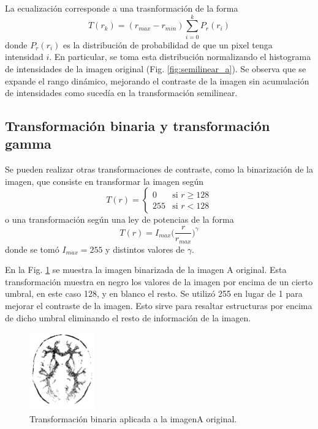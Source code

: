 \documentclass[letterpaper,12pt]{article}
\theoremstyle{plain}
\begin{document}
La ecualización corresponde a una trasnformación de la forma
\begin{equation}
    T(r_k) = (r_{max} - r_{min}) \sum_{i=0}^{k} P_r(r_i)
\end{equation}
donde $P_r(r_i)$ es la distribución de probabilidad de que un pixel tenga intensidad $i$. En particular, se toma esta distribución normalizando el histograma de intensidades de la imagen original (Fig. \ref{fig:semilinear_a}). Se observa que se expande el rango dinámico, mejorando el contraste de la imagen sin acumulación de intensidades como sucedía en la transformación semilinear.

\subsection{Transformación binaria y transformación gamma}

Se pueden realizar otras transformaciones de contraste, como la binarización de la imagen, que consiste en transformar la imagen según 
\begin{equation}
    T(r) = 
    \begin{cases}
    0 & \text{si } r \geq 128 \\
    255 & \text{si } r < 128
    \end{cases}
\end{equation}
o una transformación según una ley de potencias de la forma
\begin{equation}
    T(r) = I_{max} \biggr( \frac{r}{r_{max}}\biggr)^\gamma
\end{equation}
donde se tomó $I_{max} = 255$ y distintos valores de $\gamma$.

En la Fig. \ref{fig:binarytrans} se muestra la imagen binarizada de la imagen A original. Esta transformación muestra en negro los valores de la imagen por encima de un cierto umbral, en este caso 128, y en blanco el resto. Se utilizó 255 en lugar de 1 para mejorar el contraste de la imagen. Esto sirve para resaltar estructuras por encima de dicho umbral eliminando el resto de información de la imagen.

\begin{figure}[H]
   \centering
       \includegraphics[width=0.25\textwidth]{Figuras/ImageA_binary.png}
   \caption{Transformación binaria aplicada a la imagenA original.}
   \label{fig:binarytrans}
\end{figure}
\end{document}
